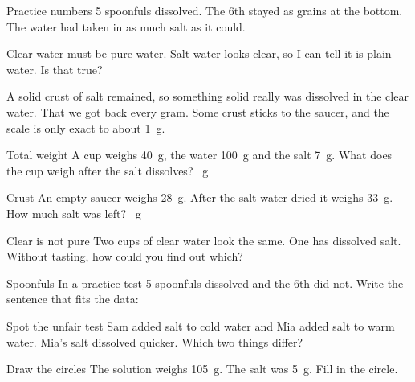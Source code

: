 \begin{worked}{Practice numbers}
5 spoonfuls dissolved. The 6th stayed as grains at the bottom. The water had taken in as much salt as it could.
\end{worked}

\begin{multix}[hmm]\multixbot[hmm]\tcblower
Clear water must be pure water. Salt water looks clear, so I can tell it is plain water. Is that true?
\end{multix}

{A solid crust of salt remained, so something solid really was dissolved in the clear water.}
{That we got back every gram. Some crust sticks to the saucer, and the scale is only exact to about 1~g.}

\clearpage

\begin{puzzle}{Total weight}
A cup weighs 40~g, the water 100~g and the salt 7~g. What does the cup weigh after the salt dissolves? \wline[1.6cm]~g
\end{puzzle}

\begin{puzzle}{Crust}
An empty saucer weighs 28~g. After the salt water dried it weighs 33~g. How much salt was left? \wline[1.6cm]~g
\end{puzzle}

\begin{puzzle}{Clear is not pure}
Two cups of clear water look the same. One has dissolved salt. Without tasting, how could you find out which? \wline[6cm]
\end{puzzle}

\begin{puzzle}{Spoonfuls}
In a practice test 5 spoonfuls dissolved and the 6th did not. Write the sentence that fits the data: \wline[6cm]
\end{puzzle}

\begin{puzzle}{Spot the unfair test}
Sam added salt to cold water and Mia added salt to warm water. Mia's salt dissolved quicker. Which two things differ? \wline[6cm]
\end{puzzle}

\clearpage

\begin{puzzle}{Draw the circles}
The solution weighs 105~g. The salt was 5~g. Fill in the circle.
\begin{center}
\end{center}
\end{puzzle}


